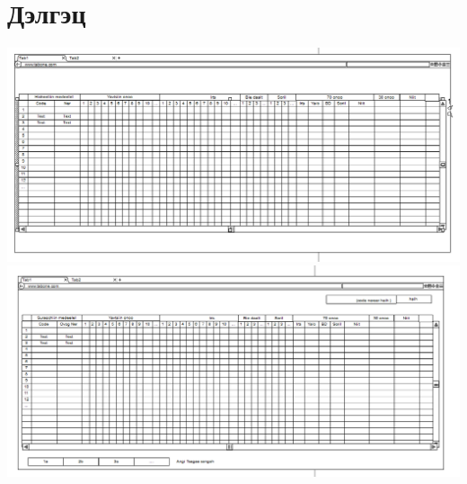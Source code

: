 \documentclass[12pd]{article}
\begin{document}
	\section{Дэлгэц}
	\includegraphics[width=\textwidth]{delgets}
	\includegraphics[width=\textwidth]{delgets2}
\end{document}

